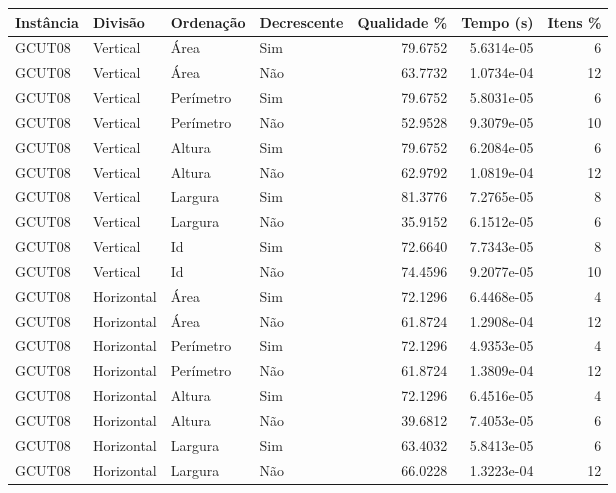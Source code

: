 \begin{tabular}{llllrrr}
    \hline
    Instância & Divisão     & Ordenação & Decrescente & Qualidade \% & Tempo (s)  & Itens \% \\
    \hline
    GCUT08    & Vertical    & Área      & Sim         & 79.6752      & 5.6314e-05 & 6        \\
    GCUT08    & Vertical    & Área      & Não         & 63.7732      & 1.0734e-04 & 12       \\
    GCUT08    & Vertical    & Perímetro & Sim         & 79.6752      & 5.8031e-05 & 6        \\
    GCUT08    & Vertical    & Perímetro & Não         & 52.9528      & 9.3079e-05 & 10       \\
    GCUT08    & Vertical    & Altura    & Sim         & 79.6752      & 6.2084e-05 & 6        \\
    GCUT08    & Vertical    & Altura    & Não         & 62.9792      & 1.0819e-04 & 12       \\
    GCUT08    & Vertical    & Largura   & Sim         & 81.3776      & 7.2765e-05 & 8        \\
    GCUT08    & Vertical    & Largura   & Não         & 35.9152      & 6.1512e-05 & 6        \\
    GCUT08    & Vertical    & Id        & Sim         & 72.6640      & 7.7343e-05 & 8        \\
    GCUT08    & Vertical    & Id        & Não         & 74.4596      & 9.2077e-05 & 10       \\
    GCUT08    & Horizontal  & Área      & Sim         & 72.1296      & 6.4468e-05 & 4        \\
    GCUT08    & Horizontal  & Área      & Não         & 61.8724      & 1.2908e-04 & 12       \\
    GCUT08    & Horizontal  & Perímetro & Sim         & 72.1296      & 4.9353e-05 & 4        \\
    GCUT08    & Horizontal  & Perímetro & Não         & 61.8724      & 1.3809e-04 & 12       \\
    GCUT08    & Horizontal  & Altura    & Sim         & 72.1296      & 6.4516e-05 & 4        \\
    GCUT08    & Horizontal  & Altura    & Não         & 39.6812      & 7.4053e-05 & 6        \\
    GCUT08    & Horizontal  & Largura   & Sim         & 63.4032      & 5.8413e-05 & 6        \\
    GCUT08    & Horizontal  & Largura   & Não         & 66.0228      & 1.3223e-04 & 12       \\

\end{tabular}
